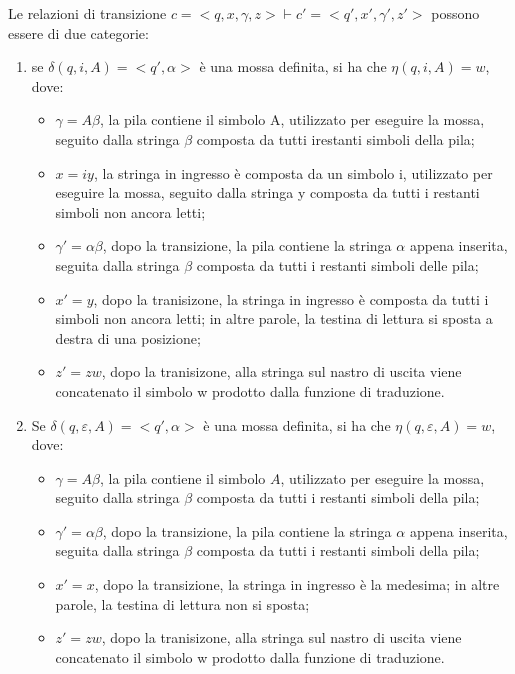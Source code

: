   \break

  \noindent Le relazioni di transizione \(c =<q,x,\gamma, z> \vdash c' = <q',x',\gamma',z'>\) possono essere di due categorie:
  \begin{enumerate}
    \item se \(\delta(q,i,A)=<q',\alpha>\) è una mossa definita, si ha che \(\eta(q,i,A) = w\), dove:
    \begin{itemize}
      \item \(\gamma =A\beta\), la pila contiene il simbolo A, utilizzato per eseguire la mossa, seguito dalla stringa \(\beta\) composta da tutti irestanti simboli della pila;
      \item \(x=iy\), la stringa in ingresso è composta da un simbolo i, utilizzato per eseguire la mossa, seguito dalla stringa y composta da tutti i restanti simboli non ancora letti;
      \item \(\gamma'=\alpha\beta\), dopo la transizione, la pila contiene la stringa \(\alpha\) appena inserita, seguita dalla stringa \(\beta\) composta da tutti i restanti simboli delle pila;
      \item \(x'=y\), dopo la tranisizone, la stringa in ingresso è composta da tutti i simboli non ancora letti; in altre parole, la testina di lettura si sposta a destra di una posizione;
      \item \(z'=zw\), dopo la tranisizone, alla stringa sul nastro di uscita viene concatenato il simbolo w prodotto dalla funzione di traduzione.  
    \end{itemize}
    \item Se \(\delta(q,\varepsilon,A)=<q',\alpha>\) è una mossa definita, si ha che \(\eta(q,\varepsilon,A) = w\), dove:
    \begin{itemize}
      \item \(\gamma=A\beta\), la pila contiene il simbolo \(A\), utilizzato per eseguire la mossa, seguito dalla stringa \(\beta\) composta da tutti i restanti simboli della pila;
      \item \(\gamma'=\alpha\beta\), dopo la transizione, la pila contiene la stringa \(\alpha\) appena inserita, seguita dalla stringa \(\beta\) composta da tutti i restanti simboli della pila;
      \item \(x'=x\), dopo la transizione, la stringa in ingresso è la medesima; in altre parole, la testina di lettura non si sposta;
      \item \(z'=zw\), dopo la tranisizone, alla stringa sul nastro di uscita viene concatenato il simbolo w prodotto dalla funzione di traduzione.
    \end{itemize}
  \end{enumerate}

